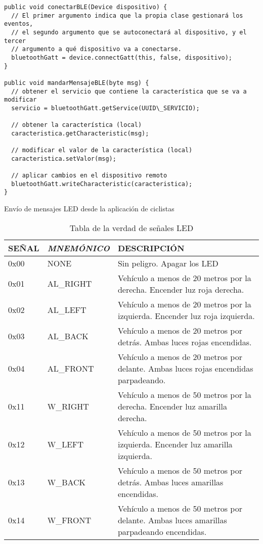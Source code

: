 \begin{description}
		\begin{listing}
			\begin{minipage}{.4\textwidth}
				\begin{verbatim}
public void conectarBLE(Device dispositivo) {
  // El primer argumento indica que la propia clase gestionará los eventos,
  // el segundo argumento que se autoconectará al dispositivo, y el tercer
  // argumento a qué dispositivo va a conectarse.
  bluetoothGatt = device.connectGatt(this, false, dispositivo);
}

public void mandarMensajeBLE(byte msg) {
  // obtener el servicio que contiene la característica que se va a modificar
  servicio = bluetoothGatt.getService(UUID\_SERVICIO);

  // obtener la característica (local)
  caracteristica.getCharacteristic(msg);

  // modificar el valor de la característica (local)
  caracteristica.setValor(msg);

  // aplicar cambios en el dispositivo remoto
  bluetoothGatt.writeCharacteristic(caracteristica);
}
				\end{verbatim}
			\end{minipage}
		\caption{Envío de mensajes LED desde la aplicación de ciclistas}\label{alg:appciclistasBLE}
	\end{listing}
\end{description}

\begin{table}[H]
	\centering
	\caption{Tabla de la verdad de señales LED}\label{tab:tablaVerdadLED}
	\begin{tabular}{lll}
		\toprule
		\textbf{SEÑAL} & \emph{MNEMÓNICO} & DESCRIPCIÓN \\
		\midrule
		0x00 & NONE    & Sin peligro. Apagar los LED \\
		0x01 & AL\_RIGHT & Vehículo a menos de 20 metros por la derecha. Encender luz
		roja derecha. \\
		0x02 & AL\_LEFT & Vehículo a menos de 20 metros por la izquierda. Encender luz
		roja izquierda. \\
		0x03 & AL\_BACK & Vehículo a menos de 20 metros por detrás. Ambas luces rojas
		encendidas. \\
		0x04 & AL\_FRONT & Vehículo a menos de 20 metros por delante. Ambas luces rojas
		encendidas parpadeando. \\
		0x11 & W\_RIGHT & Vehículo a menos de 50 metros por la derecha. Encender luz
		amarilla derecha. \\
		0x12 & W\_LEFT & Vehículo a menos de 50 metros por la izquierda. Encender luz
		amarilla izquierda. \\
		0x13 & W\_BACK & Vehículo a menos de 50 metros por detrás. Ambas luces amarillas
		encendidas. \\
		0x14 & W\_FRONT & Vehículo a menos de 50 metros por delante. Ambas luces amarillas
		parpadeando encendidas.\\
		\bottomrule
	\end{tabular}
\end{table}
